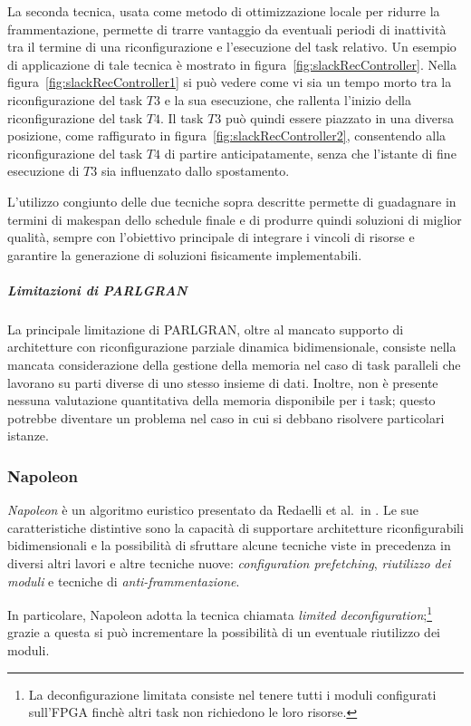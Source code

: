 La seconda tecnica, usata come metodo di ottimizzazione locale per ridurre la 
frammentazione, permette di trarre vantaggio da eventuali periodi di inattività 
tra il termine di una riconfigurazione e l'esecuzione del task relativo. Un 
esempio di applicazione di tale tecnica è mostrato in figura~\ref{fig:slackRecController}.
Nella figura~\ref{fig:slackRecController1} si può 
vedere come vi sia un tempo morto tra la riconfigurazione del task $T3$ e la sua 
esecuzione, che rallenta l'inizio della riconfigurazione del task $T4$. Il task 
$T3$ può quindi essere piazzato in una diversa posizione, come raffigurato in 
figura~\ref{fig:slackRecController2}, consentendo alla riconfigurazione del task 
$T4$ di partire anticipatamente, senza che l'istante di fine esecuzione di $T3$ 
sia influenzato dallo spostamento.


L'utilizzo congiunto delle due tecniche sopra descritte permette di guadagnare 
in termini di makespan dello schedule finale e di produrre quindi soluzioni di 
miglior qualità, sempre con l'obiettivo principale di integrare i vincoli di 
risorse e garantire la generazione di soluzioni fisicamente implementabili.


\subparagraph{Limitazioni di PARLGRAN}
La principale limitazione di PARLGRAN, oltre al mancato supporto di 
architetture con riconfigurazione parziale dinamica bidimensionale, consiste 
nella mancata considerazione della gestione della memoria nel caso di task 
paralleli che lavorano su parti diverse di uno stesso insieme di dati. Inoltre, 
non è presente nessuna valutazione quantitativa della memoria disponibile per 
i task; questo potrebbe diventare un problema nel caso in cui si debbano 
risolvere particolari istanze.


\subsubsection{Napoleon}
\emph{Napoleon} è un algoritmo euristico presentato da Redaelli et al.~in 
\cite{Redaelli2DILP}. Le sue caratteristiche distintive sono la capacità di 
supportare architetture riconfigurabili bidimensionali e la possibilità di 
sfruttare alcune tecniche viste in precedenza in diversi altri lavori e altre 
tecniche nuove: \emph{configuration prefetching}, \emph{riutilizzo dei moduli} e 
tecniche di \emph{anti-frammentazione}.

In particolare, Napoleon adotta la tecnica chiamata \emph{limited 
deconfiguration};\footnote{La deconfigurazione limitata consiste nel tenere 
tutti i moduli configurati sull'\ac{FPGA} finchè altri task non richiedono le 
loro risorse.} grazie a questa si può incrementare la possibilità di 
un eventuale riutilizzo dei moduli.

